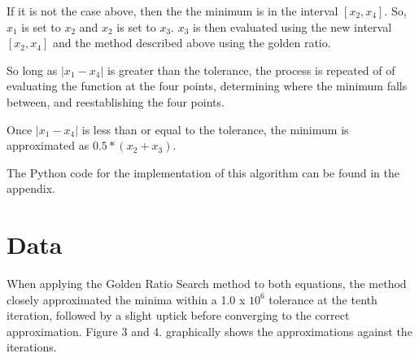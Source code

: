 \documentclass[linenumbers,RNAAS,trackchanges]{aastex631}
\begin{document}
If it is not the case above, then the the minimum is in the interval $[x_2, x_4]$. So, $x_1$ is set to $x_2$ and $x_2$ is set to $x_3$. $x_3$ is then evaluated using the new interval $[x_2, x_4]$ and the method described above using the golden ratio. 

So long as $|x_1 - x_4|$ is greater than the tolerance, the process is repeated of of evaluating the function at the four points, determining where the minimum falls between, and reestablishing the four points.

Once $|x_1 - x_4|$ is less than or equal to the tolerance, the minimum is approximated as $0.5 * (x_2 + x_3)$.

The Python code for the implementation of this algorithm can be found in the appendix. 

\section{Data} \label{sec:data}
When applying the Golden Ratio Search method to both equations, the method closely approximated the minima within a 1.0 x ${10^6}$ tolerance at the tenth iteration, followed by a slight uptick before converging to the correct approximation. Figure 3 and 4. graphically shows the approximations against the iterations. 
\end{document}
